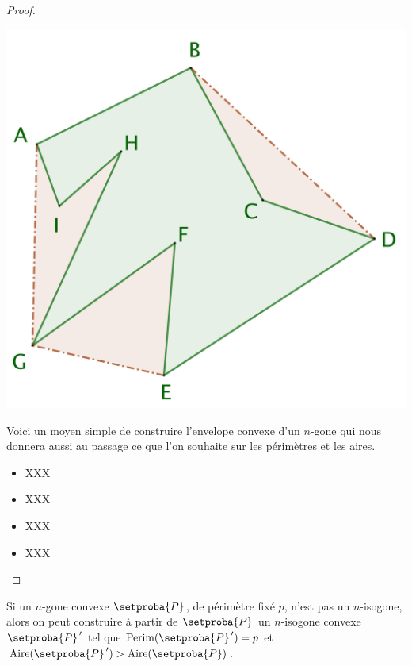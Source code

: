 \begin{proof}
	\begin{center}
		\includegraphics[scale=.4]{content/polygon/polygon-non-convex.png}
	\end{center}
	
	
	Voici un moyen simple de construire l'envelope convexe d'un $n$-gone qui nous donnera aussi au passage ce que l'on souhaite sur les périmètres et les aires.
	\begin{itemize}
		\item XXX

		\item XXX

		\item XXX

		\item XXX
	\end{itemize}
\end{proof}




\begin{fact}\label{iso-poly}
	Si un $n$-gone convexe $\setproba{P}$, de périmètre fixé $p$, n'est pas un $n$-isogone, alors on peut construire à partir de $\setproba{P}$ un $n$-isogone convexe $\setproba{P}^{\,\prime}$ tel que $\perim{\setproba{P}^{\,\prime}} = p$ et $\area{\setproba{P}^{\,\prime}} > \area{\setproba{P}}$.
\end{fact}


